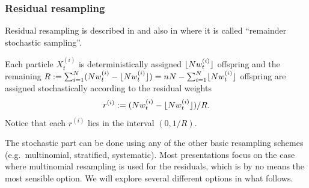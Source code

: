 \subsubsection{Residual resampling \seb{$\checkmark$} }%
Residual resampling is described in \textcite{liu1998} and also in \textcite{whitley1994} where it is called ``remainder stochastic sampling''.

Each particle $X_{t}^{(i)}$ is deterministically assigned $\lfloor N w_t^{(i)} \rfloor$ offspring and the remaining $R := \sum_{i=1}^N ( Nw_t^{(i)} - \lfloor N w_t^{(i)} \rfloor) = n                           N- \sum_{i=1}^N \lfloor N w_t^{(i)} \rfloor$ offspring are assigned stochastically according to the residual weights
\begin{equation*}
r^{(i)} := ( Nw_t^{(i)} - \lfloor N w_t^{(i)} \rfloor) /R .
\end{equation*}
Notice that each $r^{(i)}$ lies in the interval $(0, 1/R)$.

The stochastic part can be done using any of the other basic resampling schemes (e.g.\ multinomial, stratified, systematic). Most presentations focus on the case where multinomial resampling is used for the residuals, which is by no means the most sensible option. We will explore several different options in what follows.




